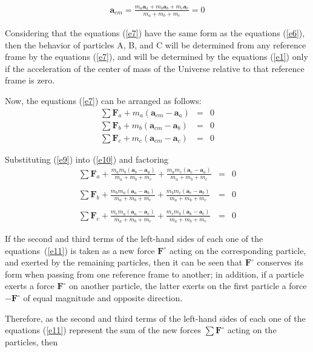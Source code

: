 \documentclass[12pt]{article}
\newcommand{\vA}{\mathbf{a}}
\newcommand{\vF}{\mathbf{F}}
\newcommand{\mM}{m}
\newcommand{\ra}{_a}
\newcommand{\rb}{_b}
\newcommand{\rc}{_c}
\newcommand{\rcm}{_{cm}}
\begin{document}
\begin{eqnarray}
\vA\rcm = \frac{\mM\ra\vA\ra + \mM\rb\vA\rb + \mM\rc\vA\rc}{\mM\ra + \mM\rb + \mM\rc} = 0 \label{e9}
\end{eqnarray}
\par Considering that the equations (\ref{e7}) have the same form as the equations (\ref{e6}), then the behavior of particles A, B, and C will be determined from any reference frame by the equations (\ref{e7}), and will be determined by the equations (\ref{e1}) only if the acceleration of the center of mass of the Universe relative to that reference frame is zero.
\par Now, the equations (\ref{e7}) can be arranged as follows:
\begin{eqnarray}
\sum \vF\ra + \mM\ra(\vA\rcm - \vA\ra) & = & 0 \nonumber \\
\sum \vF\rb + \mM\rb(\vA\rcm - \vA\rb) & = & 0 \label{e10} \\
\sum \vF\rc + \mM\rc(\vA\rcm - \vA\rc) & = & 0 \nonumber
\end{eqnarray}
\par Substituting (\ref{e9}) into (\ref{e10}) and factoring
\begin{eqnarray}
\sum \vF\ra + \frac{\mM\ra\mM\rb(\vA\rb - \vA\ra)}{\mM\ra + \mM\rb + \mM\rc} + \frac{\mM\ra\mM\rc(\vA\rc - \vA\ra)}{\mM\ra + \mM\rb + \mM\rc} & = & 0 \nonumber \\ \nonumber \\
\sum \vF\rb + \frac{\mM\rb\mM\ra(\vA\ra - \vA\rb)}{\mM\ra + \mM\rb + \mM\rc} + \frac{\mM\rb\mM\rc(\vA\rc - \vA\rb)}{\mM\ra + \mM\rb + \mM\rc} & = & 0 \label{e11} \\ \nonumber \\
\sum \vF\rc + \frac{\mM\rc\mM\ra(\vA\ra - \vA\rc)}{\mM\ra + \mM\rb + \mM\rc} + \frac{\mM\rc\mM\rb(\vA\rb - \vA\rc)}{\mM\ra + \mM\rb + \mM\rc} & = & 0 \nonumber
\end{eqnarray}
\par If the second and third terms of the left-hand sides of each one of the \hbox {equations (\ref{e11})} is taken as a new force $\vF^{\circ}$ acting on the corresponding particle, and exerted by the remaining particles, then it can be seen that $\vF^{\circ}$ conserves its form when passing from one reference frame to another; in addition, if a particle exerts a force $\vF^{\circ}$ on another particle, the latter exerts on the first particle a force $-\vF^{\circ}$ of equal magnitude and opposite direction.
\par Therefore, as the second and third terms of the left-hand sides of each one of the equations (\ref{e11}) represent the sum of the new forces $\sum \vF^{\circ}$ acting on the particles, then
\end{document}
